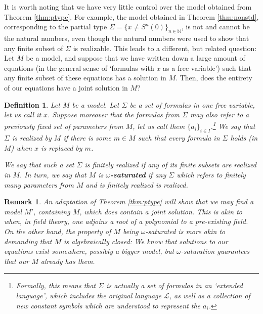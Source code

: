 \documentclass{article}
\newtheorem{remark}[theorem]{Remark}
\newtheorem{definition}[theorem]{Definition}
\theoremstyle{nonumberplain}
\newcommand{\N}{\mathbb{N}}
\newcommand{\Lang}{\mathcal{L}}
\begin{document}
It is worth noting that we have very little control over the model obtained from Theorem \ref{thm:ptype}. For example, the model obtained in Theorem \ref{thm:nonstd}, corresponding to the partial type $\Sigma = \{x \neq S^n(0)\}_{n \in \N}$, is not and cannot be the natural numbers, even though the natural numbers were used to show that any finite subset of $\Sigma$ is realizable. This leads to a different, but related question: Let $M$ be a model, and suppose that we have written down a large amount of equations (in the general sense of `formulas with $x$ as a free variable') such that any finite subset of these equations has a solution in $M$. Then, does the entirety of our equations have a joint solution in $M$?

\begin{definition}\label{def:sat}
Let $M$ be a model. Let $\Sigma$ be a set of formulas in one free variable, let us call it $x$. Suppose moreover that the formulas from $\Sigma$ may also refer to a previously fixed set of parameters from $M$, let us call them $\{a_i\}_{i \in I}$.\footnote{Formally, this means that $\Sigma$ is actually a set of formulas in an `extended language', which includes the original language $\Lang$, as well as a collection of new constant symbols which are understood to represent the $a_i$.} We say that $\Sigma$ is \emph{realized by $M$} if there is some $m \in M$ such that every formula in $\Sigma$ holds (in $M$) when $x$ is replaced by $m$.

We say that such a set $\Sigma$ is \emph{finitely realized} if any of its finite subsets are realized in $M$. In turn, we say that $M$ is \textbf{$\omega$-saturated} if any $\Sigma$ which refers to finitely many parameters from $M$ and is finitely realized is realized.
\end{definition}

\begin{remark}
An adaptation of Theorem \ref{thm:ptype} will show that we may find a model $M'$, containing $M$, which does contain a joint solution. This is akin to when, in field theory, one adjoins a root of a polynomial to a pre-existing field. On the other hand, the property of $M$ being $\omega$-saturated is more akin to demanding that $M$ is algebraically closed: We know that solutions to our equations exist \emph{somewhere}, possibly a bigger model, but $\omega$-saturation guarantees that our $M$ already has them.
\end{remark}
\end{document}
